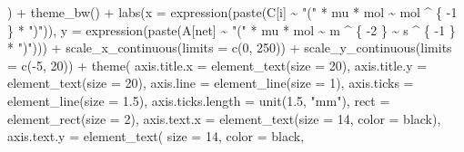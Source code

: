 \documentclass[
]{krantz}
\makeatletter
\newenvironment{Shaded}{\begin{snugshade}}{\end{snugshade}}
\newcommand{\AttributeTok}[1]{\textcolor[rgb]{0.77,0.63,0.00}{#1}}
\newcommand{\DecValTok}[1]{\textcolor[rgb]{0.00,0.00,0.81}{#1}}
\newcommand{\FloatTok}[1]{\textcolor[rgb]{0.00,0.00,0.81}{#1}}
\newcommand{\FunctionTok}[1]{\textcolor[rgb]{0.00,0.00,0.00}{#1}}
\newcommand{\NormalTok}[1]{#1}
\newcommand{\SpecialCharTok}[1]{\textcolor[rgb]{0.00,0.00,0.00}{#1}}
\newcommand{\StringTok}[1]{\textcolor[rgb]{0.31,0.60,0.02}{#1}}
\newenvironment{kframe}{%
\medskip{}
\setlength{\fboxsep}{.8em}
 \def\at@end@of@kframe{}%
 \ifinner\ifhmode%
  \def\at@end@of@kframe{\end{minipage}}%
  \begin{minipage}{\columnwidth}%
 \fi\fi%
 \def\FrameCommand##1{\hskip\@totalleftmargin \hskip-\fboxsep
 \colorbox{shadecolor}{##1}\hskip-\fboxsep
     \hskip-\linewidth \hskip-\@totalleftmargin \hskip\columnwidth}%
 \MakeFramed {\advance\hsize-\width
   \@totalleftmargin\z@ \linewidth\hsize
   \@setminipage}}%
 {\par\unskip\endMakeFramed%
 \at@end@of@kframe}
\renewenvironment{Shaded}{\begin{kframe}}{\end{kframe}}
\makeatother
\begin{document}
\begin{Shaded}
\begin{Highlighting}[]
\NormalTok{  ) }\SpecialCharTok{+}
  \FunctionTok{theme\_bw}\NormalTok{() }\SpecialCharTok{+}
  \FunctionTok{labs}\NormalTok{(}\AttributeTok{x =} \FunctionTok{expression}\NormalTok{(}\FunctionTok{paste}\NormalTok{(C[i] }\SpecialCharTok{\textasciitilde{}} \StringTok{"("} \SpecialCharTok{*}\NormalTok{ mu }\SpecialCharTok{*}\NormalTok{ mol }\SpecialCharTok{\textasciitilde{}}\NormalTok{ mol }\SpecialCharTok{\^{}}\NormalTok{ \{}
    \SpecialCharTok{{-}}\DecValTok{1}
\NormalTok{  \} }\SpecialCharTok{*} \StringTok{")"}\NormalTok{)), }\AttributeTok{y =} \FunctionTok{expression}\NormalTok{(}\FunctionTok{paste}\NormalTok{(A[net] }\SpecialCharTok{\textasciitilde{}} \StringTok{"("} \SpecialCharTok{*}\NormalTok{ mu }\SpecialCharTok{*}\NormalTok{ mol }\SpecialCharTok{\textasciitilde{}}\NormalTok{ m }\SpecialCharTok{\^{}}\NormalTok{ \{}
    \SpecialCharTok{{-}}\DecValTok{2}
\NormalTok{  \} }\SpecialCharTok{\textasciitilde{}}\NormalTok{ s }\SpecialCharTok{\^{}}\NormalTok{ \{}
    \SpecialCharTok{{-}}\DecValTok{1}
\NormalTok{  \} }\SpecialCharTok{*} \StringTok{")"}\NormalTok{))) }\SpecialCharTok{+}
  \FunctionTok{scale\_x\_continuous}\NormalTok{(}\AttributeTok{limits =} \FunctionTok{c}\NormalTok{(}\DecValTok{0}\NormalTok{, }\DecValTok{250}\NormalTok{)) }\SpecialCharTok{+}
  \FunctionTok{scale\_y\_continuous}\NormalTok{(}\AttributeTok{limits =} \FunctionTok{c}\NormalTok{(}\SpecialCharTok{{-}}\DecValTok{5}\NormalTok{, }\DecValTok{20}\NormalTok{)) }\SpecialCharTok{+}
  \FunctionTok{theme}\NormalTok{(}
    \AttributeTok{axis.title.x =} \FunctionTok{element\_text}\NormalTok{(}\AttributeTok{size =} \DecValTok{20}\NormalTok{),}
    \AttributeTok{axis.title.y =} \FunctionTok{element\_text}\NormalTok{(}\AttributeTok{size =} \DecValTok{20}\NormalTok{),}
    \AttributeTok{axis.line =} \FunctionTok{element\_line}\NormalTok{(}\AttributeTok{size =} \DecValTok{1}\NormalTok{),}
    \AttributeTok{axis.ticks =} \FunctionTok{element\_line}\NormalTok{(}\AttributeTok{size =} \FloatTok{1.5}\NormalTok{),}
    \AttributeTok{axis.ticks.length =} \FunctionTok{unit}\NormalTok{(}\FloatTok{1.5}\NormalTok{, }\StringTok{"mm"}\NormalTok{),}
    \AttributeTok{rect =} \FunctionTok{element\_rect}\NormalTok{(}\AttributeTok{size =} \DecValTok{2}\NormalTok{),}
    \AttributeTok{axis.text.x =} \FunctionTok{element\_text}\NormalTok{(}\AttributeTok{size =} \DecValTok{14}\NormalTok{, }\AttributeTok{color =} \StringTok{\textquotesingle{}black\textquotesingle{}}\NormalTok{),}
    \AttributeTok{axis.text.y =}
      \FunctionTok{element\_text}\NormalTok{(}
        \AttributeTok{size =} \DecValTok{14}\NormalTok{,}
        \AttributeTok{color =} \StringTok{\textquotesingle{}black\textquotesingle{}}\NormalTok{,}

\end{Highlighting}
\end{Shaded}
\end{document}
